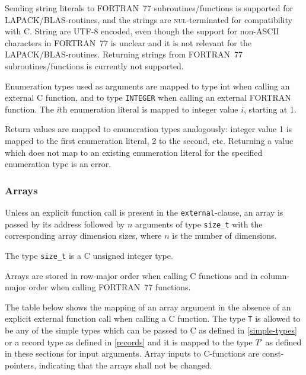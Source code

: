 Sending string literals to FORTRAN~77 subroutines/functions is supported for LAPACK/BLAS-routines, and the strings are \textsc{nul}-terminated for compatibility with C.
String are UTF-8 encoded, even though the support for non-ASCII characters in FORTRAN~77 is unclear and it is not relevant for the LAPACK/BLAS-routines.
Returning strings from FORTRAN~77 subroutines/functions is currently not supported.

Enumeration types used as arguments are mapped to type int when calling an external C function, and to type {\lstinline!INTEGER!} when calling an external FORTRAN function.
The $i$th enumeration literal is mapped to integer value $i$, starting at 1.

Return values are mapped to enumeration types analogously: integer value 1 is mapped to the first enumeration literal, 2 to the second, etc.
Returning a value which does not map to an existing enumeration literal for the specified enumeration type is an error.

\subsubsection{Arrays}\label{arrays-1}

Unless an explicit function call is present in the {\lstinline!external!}-clause, an array is passed by its address followed by $n$ arguments of type {\lstinline!size_t!} with the corresponding array dimension sizes, where $n$ is the number of dimensions.

\begin{nonnormative}
The type {\lstinline[language=C]!size_t!} is a C unsigned integer type.
\end{nonnormative}

Arrays are stored in row-major order when calling C functions and in column-major order when calling FORTRAN~77 functions.

The table below shows the mapping of an array argument in the absence of an explicit external function call when calling a C function.
The type {\lstinline!T!} is allowed to be any of the simple types which can be passed to C as defined in \cref{simple-types} or a record type as defined in \cref{records} and it is mapped to the type $T'$ as defined in these sections for input arguments.
Array inputs to C-functions are const-pointers, indicating that the arrays shall not be changed.

